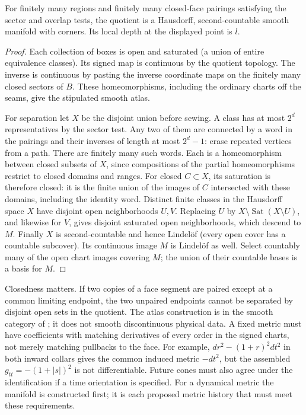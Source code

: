 \begin{proposition}\label{prop:sewn-atlas}
For finitely many regions and finitely many closed-face pairings satisfying the sector and overlap tests, the quotient is a Hausdorff, second-countable smooth manifold with corners. Its local depth at the displayed point is $l$.
\end{proposition}
\begin{proof}
Each collection of boxes is open and saturated (a union of entire equivalence classes). Its signed map is continuous by the quotient topology. The inverse is continuous by pasting the inverse coordinate maps on the finitely many closed sectors of $B$. These homeomorphisms, including the ordinary charts off the seams, give the stipulated smooth atlas.

For separation let $X$ be the disjoint union before sewing. A class has at most $2^d$ representatives by the sector test. Any two of them are connected by a word in the pairings and their inverses of length at most $2^d-1$: erase repeated vertices from a path. There are finitely many such words. Each is a homeomorphism between closed subsets of $X$, since compositions of the partial homeomorphisms restrict to closed domains and ranges. For closed $C\subset X$, its saturation is therefore closed: it is the finite union of the images of $C$ intersected with these domains, including the identity word. Distinct finite classes in the Hausdorff space $X$ have disjoint open neighborhoods $U,V$. Replacing $U$ by $X\setminus\operatorname{Sat}(X\setminus U)$, and likewise for $V$, gives disjoint saturated open neighborhoods, which descend to $M$. Finally $X$ is second-countable and hence Lindel\"of (every open cover has a countable subcover). Its continuous image $M$ is Lindel\"of as well. Select countably many of the open chart images covering $M$; the union of their countable bases is a basis for $M$.
\end{proof}

Closedness matters. If two copies of a face segment are paired except at a common limiting endpoint, the two unpaired endpoints cannot be separated by disjoint open sets in the quotient. The atlas construction is in the smooth category of \cite{Lee}; it does not smooth discontinuous physical data. A fixed metric must have coefficients with matching derivatives of every order in the signed charts, not merely matching pullbacks to the face. For example, $dr^2-(1+r)^2dt^2$ in both inward collars gives the common induced metric $-dt^2$, but the assembled $g_{tt}=-(1+|s|)^2$ is not differentiable. Future cones must also agree under the identification if a time orientation is specified. For a dynamical metric the manifold is constructed first; it is each proposed metric history that must meet these requirements.

